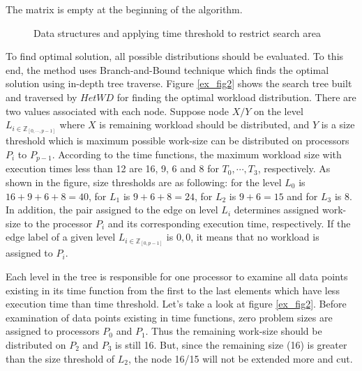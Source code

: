 \documentclass[12pt]{article}
\begin{document}
The matrix is empty at the beginning of the algorithm.

\begin{figure}[!t]
	\centering
	\caption{Data structures and applying time threshold to restrict search area}
	\label{ex_fig1}
\end{figure}

To find optimal solution, all possible distributions should be evaluated. To this end, the method uses Branch-and-Bound technique which finds the optimal solution using in-depth tree traverse. Figure \ref{ex_fig2} shows the search tree built and traversed by $HetWD$ for finding the optimal workload distribution. There are two values associated with each node. Suppose node $X/Y$ on the level $L_{i \in \mathbb{Z}_{[0,\cdots,p - 1]}}$ where $X$ is remaining workload should be distributed, and $Y$ is a size threshold which is maximum possible work-size can be distributed on processors $P_i$ to $P_{p-1}$. According to the time functions, the maximum workload size with execution times less than 12 are 16, 9, 6 and 8 for $T_0,\cdots,T_3$, respectively. As shown in the figure, size thresholds are as following: for the level $L_0$ is $16+9+6+8=40$, for $L_1$ is $9+6+8=24$, for $L_2$ is $9+6=15$ and for $L_3$ is 8. In addition, the pair assigned to the edge on level $L_{i}$ determines assigned work-size to the processor $P_i$ and its corresponding execution time, respectively. If the edge label of a given level $L_{i \in \mathbb{Z}_[0,p-1]}$ is $0,0$, it means that no workload is assigned to $P_i$. 

Each level in the tree is responsible for one processor to examine all data points existing in its time function from the first to the last elements which have less execution time than time threshold. Let's take a look at figure \ref{ex_fig2}. Before examination of data points existing in time functions, zero problem sizes are assigned to processors $P_0$ and $P_1$. Thus the remaining work-size should be distributed on $P_2$ and $P_3$ is still 16. But, since the remaining size (16) is greater than the size threshold of $L_2$, the node 16/15 will not be extended more and cut.
\end{document}

